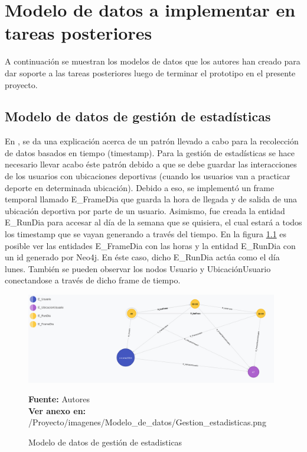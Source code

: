 \chapter{Modelo de datos a implementar en tareas posteriores}

A continuación se muestran los modelos de datos que los autores han creado para dar soporte a las tareas posteriores luego de terminar el prototipo en el presente proyecto.


\section{Modelo de datos de gestión de estadísticas}

En \cite{dependent_time_graphs}, se da una explicación acerca de un patrón llevado a cabo para la recolección de datos basados en tiempo (timestamp). Para la gestión de estadísticas se hace necesario llevar acabo éste patrón debido a que se debe guardar las interacciones de los usuarios con ubicaciones deportivas (cuando los usuarios van a practicar deporte en determinada ubicación). Debido a eso, se implementó un frame temporal llamado E\_FrameDia que guarda la hora de llegada y de salida de una ubicación deportiva por parte de un usuario. Asimismo, fue creada la entidad E\_RunDia para accesar al día de la semana que se quisiera, el cual estará a todos los timestamp que se vayan generando a través del tiempo. En la figura \ref{fig:modelo_datos_gestion_estadisticas} es posible ver las entidades E\_FrameDia con las horas y la entidad E\_RunDia con un id generado por Neo4j. En éste caso, dicho E\_RunDia actúa como el día lunes. También se pueden observar los nodos Usuario y UbicaciónUsuario conectandose a través de dicho frame de tiempo.

\begin{figure}[!htb]
  \begin{center}
    \includegraphics[width=11cm]{./imagenes/Modelo_de_datos/Gestion_estadisticas.png}
    \caption{Modelo de datos de gestión de estadisticas}
    \label{fig:modelo_datos_gestion_estadisticas}
    \textbf{Fuente:}  Autores \\
    \textbf{Ver anexo en:} /Proyecto/imagenes/Modelo\_de\_datos/Gestion\_estadisticas.png
  \end{center}
\end{figure}

